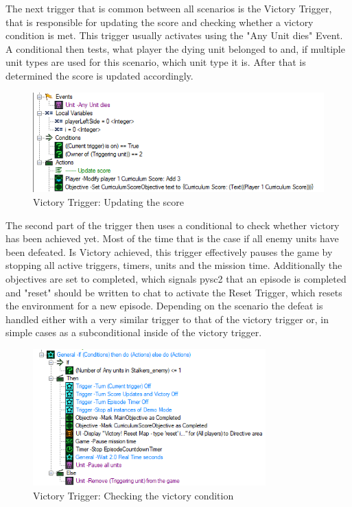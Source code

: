 The next trigger that is common between all scenarios is the Victory Trigger, that is responsible
for updating the score and checking whether a victory condition is met. This trigger usually activates using the "Any Unit dies" Event. A conditional then tests, what player the dying unit belonged to and, if multiple unit types are used for this scenario, which unit type it is. After that is determined the score is updated accordingly.

\begin{figure}[htb]
  \centering
      \includegraphics[width=1\textwidth]{Figures/Triggers/trigger_score_update.png}
  \caption{ Victory Trigger: Updating the score }
\end{figure}

The second part of the trigger then uses a conditional to check whether victory has been achieved yet. Most of the time that is the case if all enemy units have been defeated. Is Victory achieved, this trigger effectively pauses the game by stopping all active triggers, timers, units and the mission time. Additionally the objectives are set to completed, which signals pysc2 that an episode is completed and "reset" should be written to chat to activate the Reset Trigger, which resets the environment for a new episode. Depending on the scenario the defeat is handled either with a very similar trigger to that of the victory trigger or, in simple cases as a subconditional inside of the victory trigger.

\begin{figure}[htb]
  \centering
      \includegraphics[width=0.8\textwidth]{Figures/Triggers/trigger_score_victory.png}
  \caption{ Victory Trigger: Checking the victory condition }
\end{figure}

